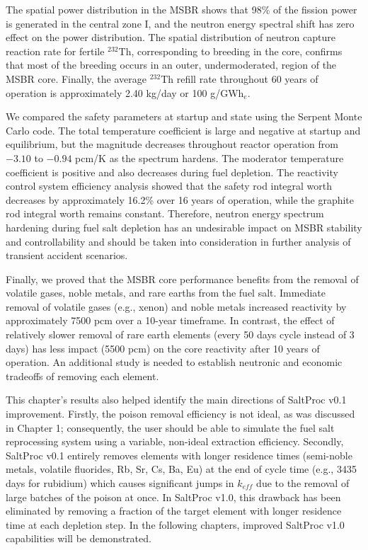 The spatial power distribution in the \gls{MSBR} shows that 98\% of the 
fission power is generated in the central zone I, and the neutron energy 
spectral shift has zero effect on the power distribution. The 
spatial distribution of neutron capture reaction rate for fertile $^{232}$Th, 
corresponding to breeding in the core, confirms that most of the breeding 
occurs in an outer, undermoderated, region of the \gls{MSBR} core. Finally, 
the average $^{232}$Th refill rate throughout 60 years of operation is 
approximately 2.40 kg/day or 100 g/GWh$_e$.

We compared the safety parameters at startup and state using the Serpent Monte 
Carlo code. The total temperature coefficient is large and negative at startup 
and equilibrium, but the magnitude decreases throughout reactor operation from 
$-3.10$ to $-0.94$ pcm/K as the spectrum hardens. The moderator temperature 
coefficient is positive and also decreases during fuel depletion. The 
reactivity control system efficiency analysis showed that the safety rod 
integral worth decreases by approximately 16.2\% over 16 years of operation, 
while the graphite rod integral worth remains constant. Therefore, neutron 
energy spectrum hardening during fuel salt depletion has an undesirable impact 
on \gls{MSBR} stability and controllability and should be taken into  
consideration in further analysis of transient accident scenarios.

Finally, we proved that the \gls{MSBR} core performance benefits from the 
removal of volatile gases, noble metals, and rare earths from the fuel salt. 
Immediate removal of volatile gases (e.g., xenon) and noble metals 
increased reactivity by approximately 7500 pcm over a 10-year timeframe. In 
contrast, the effect of relatively slower removal of rare earth elements 
(every 50 days cycle instead of 3 days) has less impact (5500 pcm) on the core 
reactivity after 10 years of operation. An additional study is needed to 
establish neutronic  and economic tradeoffs of removing each element.

This chapter's results also helped identify the main directions of SaltProc 
v0.1 improvement. Firstly, the poison removal efficiency is not ideal, as was 
discussed in Chapter 1; consequently, the user should be able to simulate the 
fuel salt reprocessing system using a variable, non-ideal extraction 
efficiency. Secondly, SaltProc v0.1 entirely removes elements with longer 
residence times (semi-noble metals, volatile fluorides, Rb, Sr, Cs, Ba, Eu) at 
the end of cycle time (e.g., 3435 days for rubidium) which causes significant  
jumps in $k_{eff}$ due to the removal of large batches of the poison at once. 
In SaltProc v1.0, this drawback has been eliminated by removing a fraction of 
the target element with longer residence time at each depletion step. In the 
following chapters, improved SaltProc v1.0 capabilities will be demonstrated.